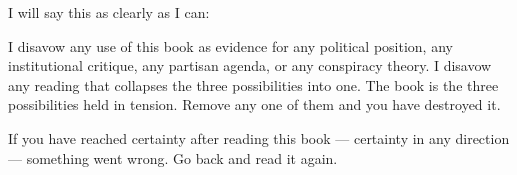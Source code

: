 I will say this as clearly as I can:

I disavow any use of this book as evidence for any political position, any institutional critique, any partisan agenda, or any conspiracy theory. I disavow any reading that collapses the three possibilities into one. The book is the three possibilities held in tension. Remove any one of them and you have destroyed it.

If you have reached certainty after reading this book --- certainty in any direction --- something went wrong. Go back and read it again.
